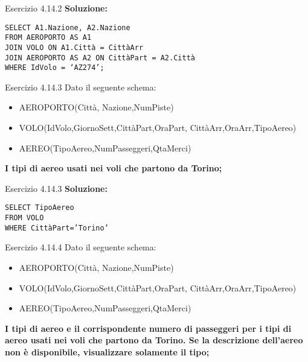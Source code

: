\begin{frame}{Esercizio 4.14.2}
    \textbf{Soluzione:}
    \vspace{1em}
    
    \texttt{SELECT A1.Nazione, A2.Nazione\\FROM AEROPORTO AS A1\\ JOIN VOLO ON A1.Citt\`a = Citt\`aArr \\JOIN AEROPORTO AS A2 ON Citt\`aPart = A2.Citt\`a\\WHERE IdVolo = `AZ274';
}
    \end{frame}
\begin{frame}{Esercizio 4.14.3}
    Dato il seguente schema:
    \begin{itemize}
        \item AEROPORTO(Citt\`a, Nazione,NumPiste)
        \item VOLO(IdVolo,GiornoSett,Citt\`aPart,OraPart,
        Citt\`aArr,OraArr,TipoAereo)
        \item AEREO(TipoAereo,NumPasseggeri,QtaMerci)
    \end{itemize}
    \vspace{1em}
    
    \textbf{I tipi di aereo usati nei voli che partono da Torino;}
\end{frame}

\begin{frame}{Esercizio 4.14.3}
    \textbf{Soluzione:}
    \vspace{1em}
    
    \texttt{SELECT TipoAereo\\FROM VOLO\\WHERE Citt\`aPart='Torino'}
    \end{frame}
\begin{frame}{Esercizio 4.14.4}
    Dato il seguente schema:
    \begin{itemize}
        \item AEROPORTO(Citt\`a, Nazione,NumPiste)
        \item VOLO(IdVolo,GiornoSett,Citt\`aPart,OraPart,
        Citt\`aArr,OraArr,TipoAereo)
        \item AEREO(TipoAereo,NumPasseggeri,QtaMerci)
    \end{itemize}
    \vspace{1em}
    
    \textbf{I tipi di aereo e il corrispondente numero di passeggeri per i tipi di aereo usati nei voli che partono da Torino. Se la descrizione dell'aereo non \`e disponibile, visualizzare solamente il tipo;}
\end{frame}


